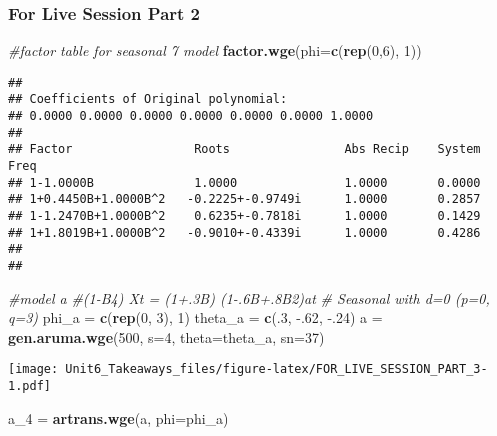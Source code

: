\documentclass[]{article}
\newenvironment{Shaded}{\begin{snugshade}}{\end{snugshade}}
\newcommand{\CommentTok}[1]{\textcolor[rgb]{0.56,0.35,0.01}{\textit{#1}}}
\newcommand{\DataTypeTok}[1]{\textcolor[rgb]{0.13,0.29,0.53}{#1}}
\newcommand{\DecValTok}[1]{\textcolor[rgb]{0.00,0.00,0.81}{#1}}
\newcommand{\FloatTok}[1]{\textcolor[rgb]{0.00,0.00,0.81}{#1}}
\newcommand{\KeywordTok}[1]{\textcolor[rgb]{0.13,0.29,0.53}{\textbf{#1}}}
\newcommand{\NormalTok}[1]{#1}
\newcommand{\StringTok}[1]{\textcolor[rgb]{0.31,0.60,0.02}{#1}}
\begin{document}
\hypertarget{for-live-session-part-2}{%
\subsubsection{For Live Session Part 2}\label{for-live-session-part-2}}

\begin{Shaded}
\begin{Highlighting}[]
\CommentTok{#factor table for seasonal 7 model}
\KeywordTok{factor.wge}\NormalTok{(}\DataTypeTok{phi=}\KeywordTok{c}\NormalTok{(}\KeywordTok{rep}\NormalTok{(}\DecValTok{0}\NormalTok{,}\DecValTok{6}\NormalTok{), }\DecValTok{1}\NormalTok{))}
\end{Highlighting}
\end{Shaded}

\begin{verbatim}
## 
## Coefficients of Original polynomial:  
## 0.0000 0.0000 0.0000 0.0000 0.0000 0.0000 1.0000 
## 
## Factor                 Roots                Abs Recip    System Freq 
## 1-1.0000B              1.0000               1.0000       0.0000
## 1+0.4450B+1.0000B^2   -0.2225+-0.9749i      1.0000       0.2857
## 1-1.2470B+1.0000B^2    0.6235+-0.7818i      1.0000       0.1429
## 1+1.8019B+1.0000B^2   -0.9010+-0.4339i      1.0000       0.4286
##   
## 
\end{verbatim}

\begin{Shaded}
\begin{Highlighting}[]
\CommentTok{#model a}
\CommentTok{#(1-B4) Xt = (1+.3B) (1-.6B+.8B2)at}
\CommentTok{# Seasonal with d=0 (p=0, q=3)}
\NormalTok{phi_a =}\StringTok{ }\KeywordTok{c}\NormalTok{(}\KeywordTok{rep}\NormalTok{(}\DecValTok{0}\NormalTok{, }\DecValTok{3}\NormalTok{), }\DecValTok{1}\NormalTok{)}
\NormalTok{theta_a =}\StringTok{ }\KeywordTok{c}\NormalTok{(.}\DecValTok{3}\NormalTok{, }\FloatTok{-.62}\NormalTok{, }\FloatTok{-.24}\NormalTok{)}
\NormalTok{a =}\StringTok{ }\KeywordTok{gen.aruma.wge}\NormalTok{(}\DecValTok{500}\NormalTok{, }\DataTypeTok{s=}\DecValTok{4}\NormalTok{, }\DataTypeTok{theta=}\NormalTok{theta_a, }\DataTypeTok{sn=}\DecValTok{37}\NormalTok{)}
\end{Highlighting}
\end{Shaded}

\texttt{[image: Unit6\_Takeaways\_files/figure-latex/FOR\_LIVE\_SESSION\_PART\_3-1.pdf]}

\begin{Shaded}
\begin{Highlighting}[]
\NormalTok{a_}\DecValTok{4}\NormalTok{ =}\StringTok{ }\KeywordTok{artrans.wge}\NormalTok{(a, }\DataTypeTok{phi=}\NormalTok{phi_a)}
\end{Highlighting}
\end{Shaded}
\end{document}
